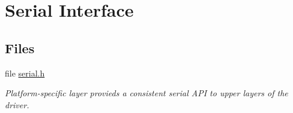 \hypertarget{group__xbee__serial}{}\section{Serial Interface}
\label{group__xbee__serial}
\subsection*{Files}
\begin{DoxyCompactItemize}
\item 
file \hyperlink{serial_8h}{serial.\+h}
\begin{DoxyCompactList}\small\item\em Platform-\/specific layer provieds a consistent serial A\+PI to upper layers of the driver. \end{DoxyCompactList}\end{DoxyCompactItemize}
